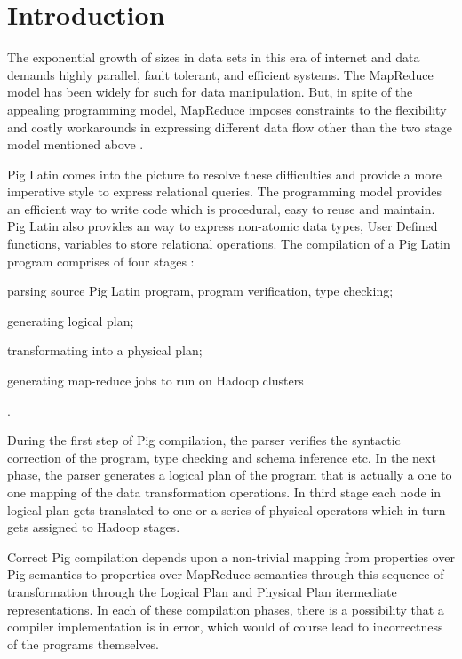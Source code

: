 \section{Introduction}
\label{sec:intro}

{\bf}

The exponential growth of sizes in data sets in this era of internet and data demands highly parallel, fault tolerant, and efficient systems. The MapReduce model \cite{dean2004mapreduce,dean2010mapreduce} has been widely for such for data manipulation. But, in spite of the appealing programming model, MapReduce imposes constraints to the flexibility and costly workarounds in expressing different data flow other than the two stage model mentioned above \cite{olston2008pig}.

Pig Latin comes into the picture to resolve these difficulties and provide a more imperative style to express relational queries. The programming model provides an efficient way to write code which is procedural, easy to reuse and maintain. Pig Latin also provides an way to express non-atomic data types, User Defined functions, variables to store relational operations.
The compilation of a Pig Latin program comprises of four stages \cite{gates2009building}: \begin{enumerate*}[label=\itshape\alph*\upshape)] \item parsing source Pig Latin program, program verification, type checking; \item generating logical plan; \item transformating into a physical plan; \item generating map-reduce jobs to run on Hadoop clusters \end{enumerate*}.

During the first step of Pig compilation, the parser verifies the syntactic correction of the program, type checking and schema inference etc. In the next phase, the parser generates a logical plan of the program that is actually a one to one mapping of the data transformation operations. In third stage each node in logical plan gets translated to one or a series of physical operators which in turn gets assigned to Hadoop stages.


Correct Pig compilation depends upon a non-trivial mapping from properties over Pig semantics to properties over MapReduce semantics through this sequence of transformation through the Logical Plan and Physical Plan itermediate representations. In each of these compilation phases, there is a possibility that a compiler implementation is in error, which would of course lead to incorrectness of the programs themselves.

